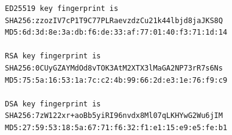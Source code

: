 \documentclass[12pt]{article}
\begin{document}
\begin{flushleft}
\begin{itemize}
\begin{verbatim}
ED25519 key fingerprint is
SHA256:zzozIV7cP1T9C77PLRaevzdzCu21k44lbjd8jaJKS8Q
MD5:6d:3d:8e:3a:db:f6:de:33:af:77:01:40:f3:71:1d:14

RSA key fingerprint is
SHA256:0CUyGZAYMdOd8vTOK3AtM2XTX3lMaGA2NP73rR7s6Ns
MD5:75:5a:16:53:1a:7c:c2:4b:99:66:2d:e3:1e:76:f9:c9

DSA key fingerprint is
SHA256:7zW122xr+aoBb5yiRI96nvdx8Ml07qLKHYwG2Wu6jIM
MD5:27:59:53:18:5a:67:71:f6:32:f1:e1:15:e9:e5:fe:b1
\end{verbatim}

\end{itemize}


\end{flushleft}
\end{document}
